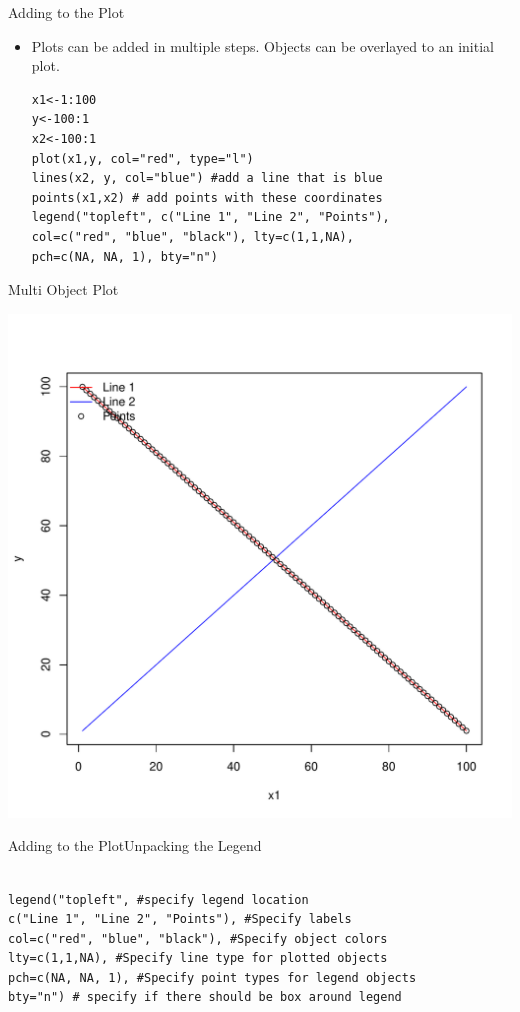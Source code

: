 \documentclass{beamer}
\begin{document}
\begin{frame}[fragile]{Adding to the Plot}
\begin{itemize}
\item Plots can be added in multiple steps.  Objects can be overlayed to an initial plot.
\begin{verbatim}
x1<-1:100
y<-100:1
x2<-100:1
plot(x1,y, col="red", type="l")
lines(x2, y, col="blue") #add a line that is blue
points(x1,x2) # add points with these coordinates
legend("topleft", c("Line 1", "Line 2", "Points"), 
col=c("red", "blue", "black"), lty=c(1,1,NA), 
pch=c(NA, NA, 1), bty="n")
\end{verbatim}
\end{itemize}
\end{frame}
\begin{frame}[fragile]{Multi Object Plot}
\begin{center}
\includegraphics[width=.8\linewidth]{addedoptions.pdf}
\end{center}
\end{frame}

\begin{frame}[fragile]{Adding to the Plot}{Unpacking the Legend}

\begin{verbatim}

legend("topleft", #specify legend location
c("Line 1", "Line 2", "Points"), #Specify labels
col=c("red", "blue", "black"), #Specify object colors
lty=c(1,1,NA), #Specify line type for plotted objects
pch=c(NA, NA, 1), #Specify point types for legend objects
bty="n") # specify if there should be box around legend
\end{verbatim}

\end{frame}
\end{document}
